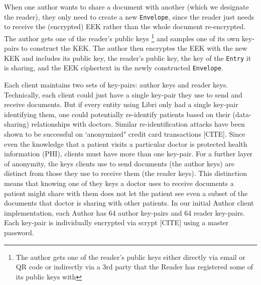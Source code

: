 \documentclass[10pt]{article}
\newcommand{\ttt}[1]{\texttt{#1}}
\def\Entry{\ttt{Entry}}
\def\Envelope{\ttt{Envelope}}
\begin{document}
When one author wants to share a document with another (which we designate the reader), they only need to create a new \Envelope{}, since the reader just needs to receive the (encrypted) EEK rather than the whole document re-encrypted. The author gets one of the reader's public keys \footnote{The author gets one of the reader's public keys either directly via email or QR code or indirectly via a 3rd party that the Reader has registered some of its public keys with} and samples one of its own key-pairs to construct the KEK. The author then encryptes the EEK with the new KEK and includes its public key, the reader's public key, the key of the \Entry{} it is sharing, and the EEK ciphertext in the newly constructed \Envelope{}. 

Each client maintains two sets of key-pairs: author keys and reader keys. Technically, each client could just have a single key-pair they use to send and receive documents. But if every entity using Libri only had a single key-pair identifying them, one could potentially re-identify patients based on their (data-sharing) relationships with doctors. Similar re-identification attacks have been shown to be successful on `anonymized" credit card transactions [CITE]. Since even the knowledge that a patient visits a particular doctor is protected health information (PHI), clients must have more than one key-pair. For a further layer of anonymity, the keys clients use to send documents (the author keys) are distinct from those they use to receive them (the reader keys). This distinction means that knowing one of they keys a doctor uses to receive documents a patient might share with them does not let the patient see even a subset of the documents that doctor is sharing with other patients. In our initial Author client implementation, each Author has 64 author key-pairs and 64 reader key-pairs. Each key-pair is individually encrypted via scrypt [CITE] using a master password.
\end{document}
